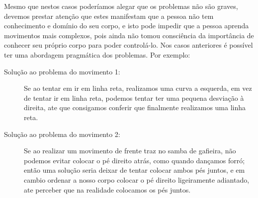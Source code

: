 Mesmo que nestos casos poderíamos alegar que os problemas não são graves,
devemos prestar atenção que estes manifestam que a pessoa não tem conhecimento e domínio do seu corpo,
e isto pode impedir que a pessoa aprenda movimentos mais complexos,
pois ainda não tomou consciência da importância de conhecer seu próprio corpo para poder controlá-lo.
Nos casos anteriores é possível ter uma abordagem pragmática dos problemas.
Por exemplo:
\begin{description}
\item[Solução ao problema do movimento 1:] Se ao tentar em ir em linha reta, realizamos uma curva a esquerda,
em vez de tentar ir em linha reta, podemos tentar ter uma pequena desviação à direita,
ate que consigamos conferir que finalmente realizamos uma linha reta.
\item[Solução ao problema do movimento 2:] Se ao realizar um movimento de frente traz no samba de gafieira,
não podemos evitar colocar o pé direito atrás,
como quando dançamos forró; 
então uma solução seria deixar de tentar colocar ambos pés juntos,
e em cambio ordenar a nosso corpo colocar o pé direito ligeiramente adiantado,
ate perceber que na realidade colocamos os pés juntos.
\end{description} 


